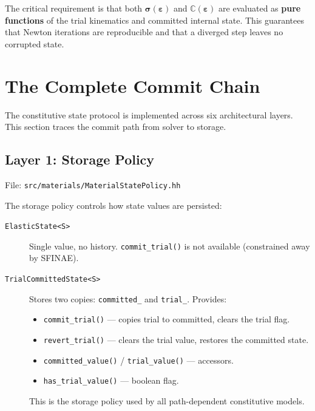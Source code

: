 The critical requirement is that both
$\boldsymbol{\sigma}(\boldsymbol{\varepsilon})$ and
$\mathbb{C}(\boldsymbol{\varepsilon})$ are evaluated as
\textbf{pure functions} of the trial kinematics and committed
internal state.  This guarantees that Newton iterations are
reproducible and that a diverged step leaves no corrupted state.


\section{The Complete Commit Chain}
\label{sec:phase1-commit-chain}

The constitutive state protocol is implemented across six architectural
layers. This section traces the commit path from solver to storage.

\subsection{Layer 1: Storage Policy}
\label{sec:layer1-storage}

File: \texttt{src/materials/MaterialStatePolicy.hh}

The storage policy controls how state values are persisted:

\begin{description}
  \item[\texttt{ElasticState<S>}]
    Single value, no history.  \texttt{commit\_trial()} is not available
    (constrained away by SFINAE).

  \item[\texttt{TrialCommittedState<S>}]
    Stores two copies: \texttt{committed\_} and
    \texttt{trial\_}.  Provides:
    \begin{itemize}
      \item \texttt{commit\_trial()} --- copies trial to committed,
            clears the trial flag.
      \item \texttt{revert\_trial()} --- clears the trial value,
            restores the committed state.
      \item \texttt{committed\_value()} / \texttt{trial\_value()} ---
            accessors.
      \item \texttt{has\_trial\_value()} --- boolean flag.
    \end{itemize}
    This is the storage policy used by all path-dependent constitutive
    models.
\end{description}

